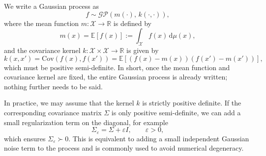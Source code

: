 \documentclass[../main]{subfiles}
\begin{document}
We write a Gaussian process as
\begin{equation}
    f \sim \mathcal{GP}\!\left(m(\cdot),\, k(\cdot,\cdot)\right),
\end{equation}
where the mean function $m:\mathcal X\to\mathbb{R}$ is defined by
\begin{equation}
    m(x) = \mathbb{E}[f(x)]:=\int_{\mathcal X} f(x)\,\mathrm d\mu(x),
\end{equation}
and the covariance kernel $k:\mathcal X\times\mathcal X\to\mathbb{R}$ is given by
\begin{equation}
    k(x,x') 
    = \mathrm{Cov}\!\left(f(x), f(x')\right)
    = \mathbb{E}\!\left[(f(x)-m(x))(f(x')-m(x'))\right],
\end{equation}
which must be positive semi-definite. In short, once the mean function and covariance kernel are fixed, the entire
Gaussian process is already written; nothing further needs to be said.
\begin{remark}
    In practice, we may assume that the kernel $k$ is strictly positive definite.
    If the corresponding covariance matrix $\Sigma$ is only positive semi-definite,
    we can add a small regularization term on the diagonal, for example
    \begin{equation}
        \Sigma_\varepsilon = \Sigma + \varepsilon I,\qquad \varepsilon > 0,
    \end{equation}
    which ensures $\Sigma_\varepsilon \succ 0$.
    This is equivalent to adding a small independent Gaussian noise term to the process
    and is commonly used to avoid numerical degeneracy.
\end{remark}
\end{document}
